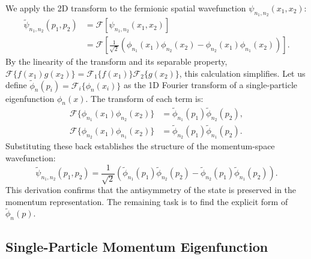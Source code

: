 We apply the 2D transform to the fermionic spatial wavefunction
$\psi_{n_1, n_2}(x_1, x_2)$:
\begin{align}
  \tilde{\psi}_{n_1, n_2}(p_1, p_2) &= \mathcal{F}\left[
    \psi_{n_1, n_2}(x_1, x_2) \right] \\
    &= \mathcal{F}\left[ \frac{1}{\sqrt{2}}\left(
    \phi_{n_1}(x_1)\phi_{n_2}(x_2) -
    \phi_{n_2}(x_1)\phi_{n_1}(x_2)\right) \right].
\end{align}
By the linearity of the transform and its separable property,
$\mathcal{F}\{f(x_1)g(x_2)\} = \mathcal{F}_1\{f(x_1)\} \mathcal{F}_2\{g(x_2)\}$,
this calculation simplifies. Let us define
$\tilde{\phi}_{n}(p_i) = \mathcal{F}_i\{\phi_{n}(x_i)\}$ as the 1D
Fourier transform of a single-particle eigenfunction $\phi_n(x)$.
The transform of each term is:
\begin{align}
  \mathcal{F}\{\phi_{n_1}(x_1)\phi_{n_2}(x_2)\} &=
    \tilde{\phi}_{n_1}(p_1) \tilde{\phi}_{n_2}(p_2), \\
  \mathcal{F}\{\phi_{n_2}(x_1)\phi_{n_1}(x_2)\} &=
    \tilde{\phi}_{n_2}(p_1) \tilde{\phi}_{n_1}(p_2).
\end{align}
Substituting these back establishes the structure of the
momentum-space wavefunction:
\begin{equation}
  \tilde{\psi}_{n_1, n_2}(p_1, p_2) = \frac{1}{\sqrt{2}} \left(
  \tilde{\phi}_{n_1}(p_1) \tilde{\phi}_{n_2}(p_2) -
  \tilde{\phi}_{n_2}(p_1) \tilde{\phi}_{n_1}(p_2) \right).
  \label{eq:momentum_wavefunction_structure}
\end{equation}
This derivation confirms that the antisymmetry of the state is
preserved in the momentum representation. The remaining task
is to find the explicit form of $\tilde{\phi}_n(p)$.

\subsection{Single-Particle Momentum Eigenfunction}

